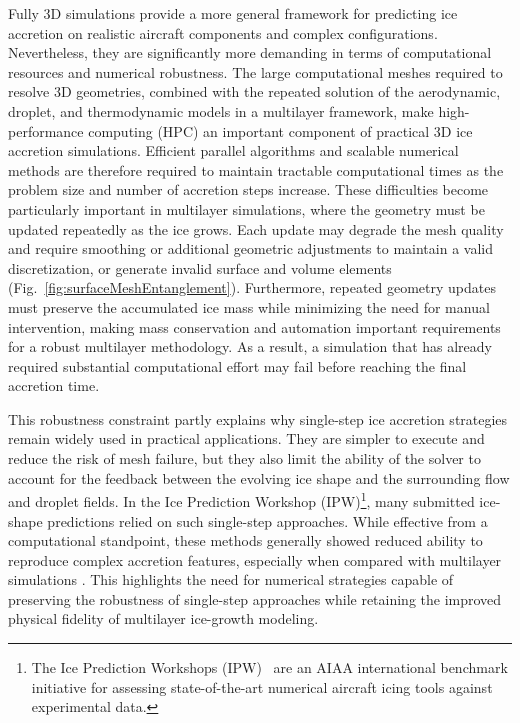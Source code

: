 Fully 3D simulations provide a more general framework for predicting ice accretion on realistic aircraft components and complex configurations. Nevertheless, they are significantly more demanding in terms of computational resources and numerical robustness.
The large computational meshes required to resolve 3D geometries, combined with the repeated solution of the aerodynamic, droplet, and thermodynamic models in a multilayer framework, make high-performance computing (HPC) an important component of practical 3D ice accretion simulations. Efficient parallel algorithms and scalable numerical methods are therefore required to maintain tractable computational times as the problem size and number of accretion steps increase.
These difficulties become particularly important in multilayer simulations, where the geometry must be updated repeatedly as the ice grows. Each update may degrade the mesh quality and require smoothing or additional geometric adjustments to maintain a valid discretization, or generate invalid surface and volume elements (Fig.~\ref{fig:surfaceMeshEntanglement}). Furthermore, repeated geometry updates must preserve the accumulated ice mass while minimizing the need for manual intervention, making mass conservation and automation important requirements for a robust multilayer methodology. As a result, a simulation that has already required substantial computational effort may fail before reaching the final accretion time.

This robustness constraint partly explains why single-step ice accretion strategies remain widely used in practical applications. They are simpler to execute and reduce the risk of mesh failure, but they also limit the ability of the solver to account for the feedback between the evolving ice shape and the surrounding flow and droplet fields. In the Ice Prediction Workshop (IPW)\footnote{The Ice Prediction Workshops (IPW)~\cite{laurendeau2022summary,laurendeau2024summary} are an AIAA international benchmark initiative for assessing state-of-the-art numerical aircraft icing tools against experimental data.}, many submitted ice-shape predictions relied on such single-step approaches. While effective from a computational standpoint, these methods generally showed reduced ability to reproduce complex accretion features, especially when compared with multilayer simulations \cite{laurendeau2022summary,laurendeau2024summary}. This highlights the need for numerical strategies capable of preserving the robustness of single-step approaches while retaining the improved physical fidelity of multilayer ice-growth modeling.

